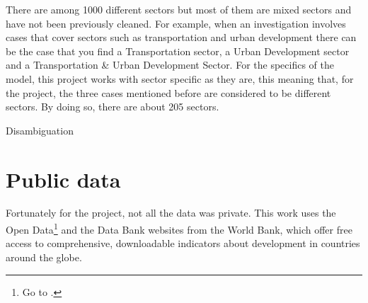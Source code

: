 There are among 1000 different sectors but most of them are mixed sectors and have not been previously cleaned. For example, when an investigation involves cases that cover sectors such as transportation and urban development there can be the case that you find a Transportation sector, a Urban Development sector and a Transportation \& Urban Development Sector. For the specifics of the model, this project works with sector specific as they are, this meaning that, for the project, the three cases mentioned before are considered to be different sectors. By doing so, there are about 205 sectors.




Disambiguation

\section{Public data}\label{sec_public_data}


Fortunately for the project, not all the data was private. This work uses the Open Data\footnote{Go to \cite{wb_data}.}  and the Data Bank websites from the World Bank, which offer free access to comprehensive, downloadable indicators about development in countries around the globe. 

